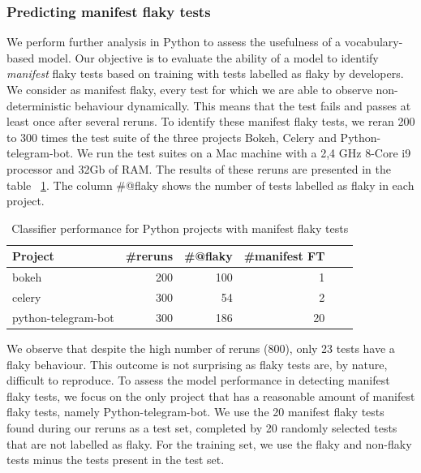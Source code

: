 \subsubsection{Predicting manifest flaky tests}
We perform further analysis in Python to assess the usefulness of a vocabulary-based model. 
Our objective is to evaluate the ability of a model to identify \textit{manifest} flaky tests based on training with tests labelled as flaky by developers. 
We consider as manifest flaky, every test for which we are able to observe non-deterministic behaviour dynamically.
This means that the test fails and passes at least once after several reruns.
To identify these manifest flaky tests, we reran 200 to 300 times the test suite of the three projects Bokeh, Celery and Python-telegram-bot. 
We run the test suites on a Mac machine with a 2,4 GHz 8-Core i9 processor and 32Gb of RAM.
The results of these reruns are presented in the table ~\ref{manifestStudy}.
The column \#@flaky shows the number of tests labelled as flaky in each project.
\begin{table}
\centering
\vspace{1.0em}
\caption{Classifier performance for Python projects with manifest flaky tests}
\label{manifestStudy}
 \begin{tabular}{l|r r r r r} 
 \hline
 \textbf{Project} & \textbf{\#reruns} & \textbf{\#@flaky} & \textbf{\#manifest FT}\\ [0.25ex]
 \hline
 bokeh & 200 & 100 & 1 \\
 celery & 300 & 54 & 2 \\
 python-telegram-bot & 300 & 186 & 20 \\ 
 \hline
\end{tabular}
\vspace{1.0em}
\end{table}

We observe that despite the high number of reruns (800), only 23 tests have a flaky behaviour.
This outcome is not surprising as flaky tests are, by nature, difficult to reproduce. 
To assess the model performance in detecting manifest flaky tests, we focus on the only project that has a reasonable amount of manifest flaky tests, namely Python-telegram-bot. 
We use the 20 manifest flaky tests found during our reruns as a test set, completed by 20 randomly selected tests that are not labelled as flaky.
For the training set, we use the flaky and non-flaky tests minus the tests present in the test set. 


